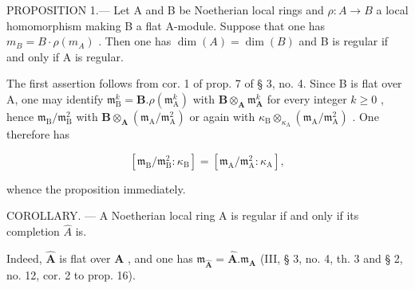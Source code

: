 PROPOSITION 1.--- Let A and B be Noetherian local rings and \(\rho:A\to B\) a local homomorphism making B a flat A-module. Suppose that one has \(m_{B} = B \cdot \rho(m_{A})\) . Then one has \(\dim(A) = \dim(B)\) and B is regular if and only if A is regular.

The first assertion follows from cor. 1 of prop. 7 of § 3, no. 4. Since B is flat over A, one may identify \(\mathfrak{m}_{\mathrm{B}}^{k} = \mathbf{B}.\rho (\mathfrak{m}_{\mathrm{A}}^{k})\) with \(\mathbf{B}\otimes_{\mathbf{A}}\mathfrak{m}_{\mathbf{A}}^{k}\) for every integer \(k\geqslant 0\) , hence \(\mathfrak{m}_{\mathrm{B}} / \mathfrak{m}_{\mathrm{B}}^{2}\) with \(\mathbf{B}\otimes_{\mathbf{A}}(\mathfrak{m}_{\mathrm{A}} / \mathfrak{m}_{\mathrm{A}}^{2})\) or again with \(\kappa_{\mathrm{B}}\otimes_{\kappa_{\mathrm{A}}}(\mathfrak{m}_{\mathrm{A}} / \mathfrak{m}_{\mathrm{A}}^{2})\) . One therefore has

\[
\left[ \mathfrak {m} _ {\mathrm{B}} / \mathfrak {m} _ {\mathrm{B}} ^ {2}: \kappa_ {\mathrm{B}} \right] = \left[ \mathfrak {m} _ {\mathrm{A}} / \mathfrak {m} _ {\mathrm{A}} ^ {2}: \kappa_ {\mathrm{A}} \right],\tag{2}
\]

whence the proposition immediately.

COROLLARY. --- A Noetherian local ring A is regular if and only if its completion \(\hat{A}\) is.

Indeed, \(\hat{\mathbf{A}}\) is flat over \(\mathbf{A}\) , and one has \(\mathfrak{m}_{\hat{\mathbf{A}}} = \hat{\mathbf{A}}. \mathfrak{m}_{\mathbf{A}}\) (III, § 3, no. 4, th. 3 and § 2, no. 12, cor. 2 to prop. 16).

